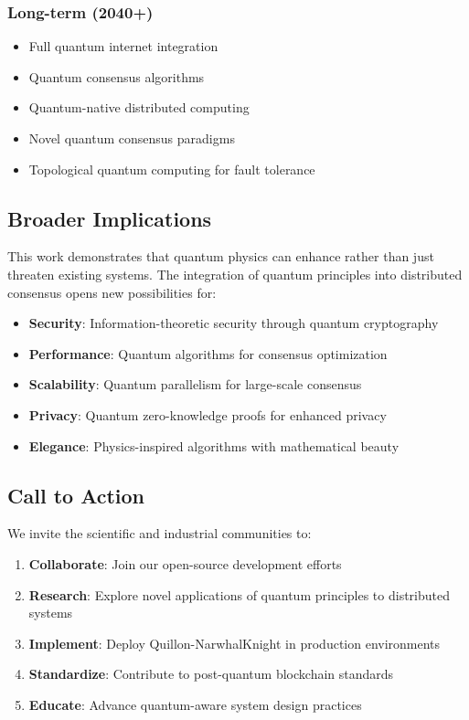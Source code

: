 \documentclass[11pt,a4paper]{article}
\begin{document}
\subsubsection{Long-term (2040+)}
\begin{itemize}
    \item Full quantum internet integration
    \item Quantum consensus algorithms
    \item Quantum-native distributed computing
    \item Novel quantum consensus paradigms
    \item Topological quantum computing for fault tolerance
\end{itemize}

\subsection{Broader Implications}

This work demonstrates that quantum physics can enhance rather than just threaten existing systems. The integration of quantum principles into distributed consensus opens new possibilities for:

\begin{itemize}
    \item \textbf{Security}: Information-theoretic security through quantum cryptography
    \item \textbf{Performance}: Quantum algorithms for consensus optimization
    \item \textbf{Scalability}: Quantum parallelism for large-scale consensus
    \item \textbf{Privacy}: Quantum zero-knowledge proofs for enhanced privacy
    \item \textbf{Elegance}: Physics-inspired algorithms with mathematical beauty
\end{itemize}

\subsection{Call to Action}

We invite the scientific and industrial communities to:

\begin{enumerate}
    \item \textbf{Collaborate}: Join our open-source development efforts
    \item \textbf{Research}: Explore novel applications of quantum principles to distributed systems
    \item \textbf{Implement}: Deploy Quillon-NarwhalKnight in production environments
    \item \textbf{Standardize}: Contribute to post-quantum blockchain standards
    \item \textbf{Educate}: Advance quantum-aware system design practices
\end{enumerate}
\end{document}
